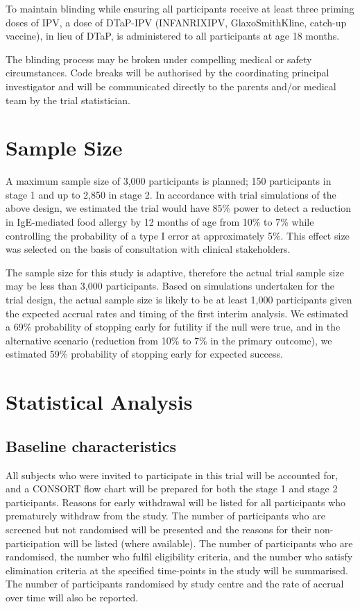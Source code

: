 \documentclass{bmcart}
\begin{document}
To maintain blinding while ensuring all participants receive at least three priming doses of IPV, a dose of DTaP-IPV (INFANRIX\textregistered IPV, GlaxoSmithKline, catch-up vaccine), in lieu of DTaP, is administered to all participants at age 18 months.

The blinding process may be broken under compelling medical or safety circumstances. 
Code breaks will be authorised by the coordinating principal investigator and will be communicated directly to the parents and/or medical team by the trial statistician.

\section*{Sample Size}

A maximum sample size of 3,000 participants is planned; 150 participants in stage 1 and up to 2,850 in stage 2.
In accordance with trial simulations of the above design, we estimated the trial would have 85\% power to detect a reduction in IgE-mediated food allergy by 12 months of age from 10\% to 7\% while controlling the probability of a type I error at approximately 5\%.
This effect size was selected on the basis of consultation with clinical stakeholders.  

The sample size for this study is adaptive, therefore the actual trial sample size may be less than 3,000 participants. Based on simulations undertaken for the trial design, the actual sample size is likely to be at least 1,000 participants given the expected accrual rates and timing of the first interim analysis.
We estimated a 69\% probability of stopping early for futility if the null were true, and in the alternative scenario (reduction from 10\% to 7\% in the primary outcome), we estimated 59\% probability of stopping early for expected success.

\section*{Statistical Analysis}

\subsection*{Baseline characteristics}

All subjects who were invited to participate in this trial will be accounted for, and a CONSORT flow chart will be prepared for both the stage 1 and stage 2 participants.
Reasons for early withdrawal will be listed for all participants who prematurely withdraw from the study.
The number of participants who are screened but not randomised will be presented and the reasons for their non-participation will be listed (where available).
The number of participants who are randomised, the number who fulfil eligibility criteria, and the number who satisfy elimination criteria at the specified time-points in the study will be summarised.
The number of participants randomised by study centre and the rate of accrual over time will also be reported.
\end{document}
